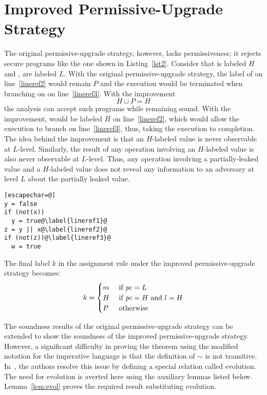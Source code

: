 \section{Improved Permissive-Upgrade Strategy}
\label{sec:ipus}

The original permissive-upgrade strategy, however, lacks 
permissiveness; it rejects secure programs like the one shown in
Listing~\ref{lst2}. Consider that  is labeled $H$
and ,  are labeled $L$. With the original permissive-upgrade
strategy, the label of  on
line~\ref{lineref2} would remain $P$ and the execution would be
terminated when branching on  on line~\ref{lineref3}. With the 
improvement $$H \sqcup P = H$$ the analysis can accept such programs
while remaining sound. With the improvement,  would be labeled
$H$ on line~\ref{lineref2}, which would allow the execution to branch
on line~\ref{lineref3}, thus, 
taking the execution to completion. 
The idea behind the improvement is that an $H$-labeled value is
never observable at $L$-level. Similarly, the result of any operation
involving an $H$-labeled value is also never observable at
$L$-level. Thus, any operation involving a partially-leaked value and
a $H$-labeled value does not reveal any information to an adversary at
level $L$ about the partially leaked value. 

\begin{lstlisting}[float,label=lst2,caption=Example showing the
  impermissiveness of the original permissive-upgrade strategy][escapechar=@]
y = false
if (not(x))
  y = true@\label{lineref1}@
z = y || x@\label{lineref2}@
if (not(z))@\label{lineref3}@
  w = true
\end{lstlisting}

The final label $k$ in the assignment rule  under
the improved permissive-upgrade strategy becomes: 
$$ k = %
\begin{cases}
m & \mbox{ if } \pc = L \\
H  & \mbox{ if } \pc = H \mbox{ and } l = H\\
P  & \mbox{ otherwise}
\end{cases} %
$$

The soundness results of the original permissive-upgrade strategy can
be extended to show the soundness of the improved permissive-upgrade
strategy. However, a significant difficulty in proving the theorem
using the modified notation for the imperative language is that the
definition of $\sim$ is not transitive. %
In~\cite{plas10}, the authors resolve this 
issue by defining a special relation called evolution. The need for
evolution is averted here using the auxiliary lemmas listed
below. Lemma~\ref{lem:evol} proves the required result substituting
evolution.  

